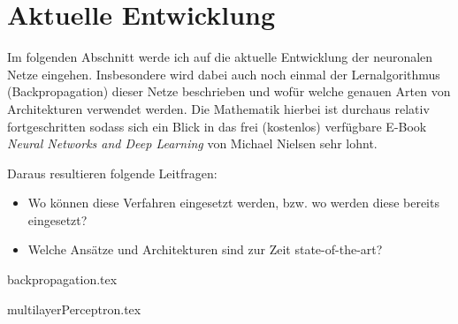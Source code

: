 \part{Aktuelle Entwicklung}

Im folgenden Abschnitt werde ich auf die aktuelle Entwicklung der neuronalen Netze eingehen. Insbesondere wird dabei auch noch einmal der Lernalgorithmus (Backpropagation) dieser Netze beschrieben und wofür welche genauen Arten von Architekturen verwendet werden. Die Mathematik hierbei ist durchaus relativ fortgeschritten sodass sich ein Blick in das frei (kostenlos) verfügbare E-Book \emph{Neural Networks and Deep Learning} von Michael Nielsen \cite{dlnielsen} sehr lohnt. 

Daraus resultieren folgende Leitfragen: 

\begin{itemize}
\item Wo können diese Verfahren eingesetzt werden, bzw. wo werden diese bereits eingesetzt?
\item Welche Ansätze und Architekturen sind zur Zeit state-of-the-art?
\end{itemize}

{backpropagation.tex}
\clearpage

{multilayerPerceptron.tex}
\clearpage

